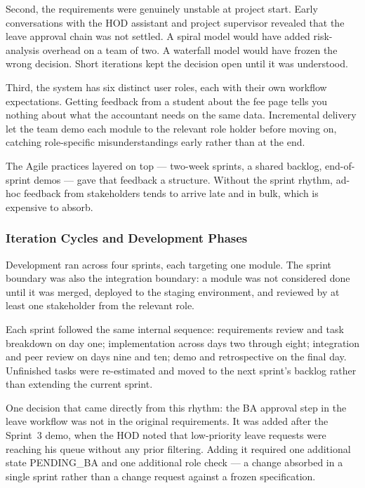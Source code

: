 Second, the requirements were genuinely unstable at project start. Early conversations
with the HOD assistant and project supervisor revealed that the leave approval chain was not settled. A spiral model would have added risk-analysis overhead on a team of two.
A waterfall model would have frozen the wrong decision. Short iterations kept the
decision open until it was understood.

Third, the system has six distinct user roles, each with their own workflow
expectations. Getting feedback from a student about the fee page tells you nothing
about what the accountant needs on the same data. Incremental delivery let the team
demo each module to the relevant role holder before moving on, catching role-specific
misunderstandings early rather than at the end.

The Agile practices layered on top --- two-week sprints, a shared backlog, end-of-sprint
demos --- gave that feedback a structure. Without the sprint rhythm, ad-hoc feedback
from stakeholders tends to arrive late and in bulk, which is expensive to absorb.

\subsubsection{Iteration Cycles and Development Phases}

Development ran across four sprints, each targeting one module. The sprint boundary
was also the integration boundary: a module was not considered done until it was
merged, deployed to the staging environment, and reviewed by at least one stakeholder
from the relevant role.

Each sprint followed the same internal sequence: requirements review and task
breakdown on day one; implementation across days two through eight; integration and
peer review on days nine and ten; demo and retrospective on the final day. Unfinished
tasks were re-estimated and moved to the next sprint's backlog rather than extending
the current sprint.

One decision that came directly from this rhythm: the BA approval step in
the leave workflow was not in the original requirements. It was added after the
Sprint~3 demo, when the HOD noted that low-priority leave requests were reaching his
queue without any prior filtering. Adding it required one additional state
PENDING\_BA and one additional role check --- a change absorbed in a single
sprint rather than a change request against a frozen specification.

